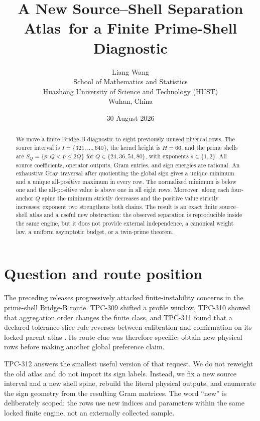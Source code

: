 \documentclass[10pt,a4paper]{article}
\title{A New Source--Shell Separation Atlas\
       for a Finite Prime-Shell Diagnostic}
\author{Liang Wang\\
School of Mathematics and Statistics\\
Huazhong University of Science and Technology (HUST)\\
Wuhan, China}
\date{30 August 2026}
\begin{document}
\maketitle

\begin{abstract}
We move a finite Bridge-B diagnostic to eight previously unused physical rows.
The source interval is $I=\{321,\ldots,640\}$, the kernel height is $H=66$,
and the prime shells are $S_Q=\{p:Q<p\leq 2Q\}$ for
$Q\in\{24,36,54,80\}$, with exponents $s\in\{1,2\}$.  All source
coefficients, operator outputs, Gram entries, and sign energies are rational.
An exhaustive Gray traversal after quotienting the global sign gives a unique
minimum and a unique all-positive maximum in every row.  The normalized
minimum is below one and the all-positive value is above one in all eight rows.
Moreover, along each four-anchor $Q$ spine the minimum strictly decreases and
the positive value strictly increases; exponent two strengthens both chains.
The result is an exact finite source--shell atlas and a useful new obstruction:
the observed separation is reproducible inside the same engine, but it does not
provide external independence, a canonical weight law, a uniform asymptotic
budget, or a twin-prime theorem.
\end{abstract}

\section{Question and route position}

The preceding releases progressively attacked finite-instability concerns in
the prime-shell Bridge-B route.  TPC-309 shifted a profile window, TPC-310
showed that aggregation order changes the finite class, and TPC-311 found that
a declared tolerance-slice rule reverses between calibration and confirmation
on its locked parent atlas \cite{tpc309,tpc310,tpc311}.  Its route clue was
therefore specific: obtain new physical rows before making another global
preference claim.

TPC-312 answers the smallest useful version of that request.  We do not
reweight the old atlas and do not import its sign labels.  Instead, we fix a
new source interval and a new shell spine, rebuild the literal physical
outputs, and enumerate the sign geometry from the resulting Gram matrices.
The word ``new'' is deliberately scoped: the rows use new indices and
parameters within the same locked finite engine, not an externally collected
sample.
\end{document}
